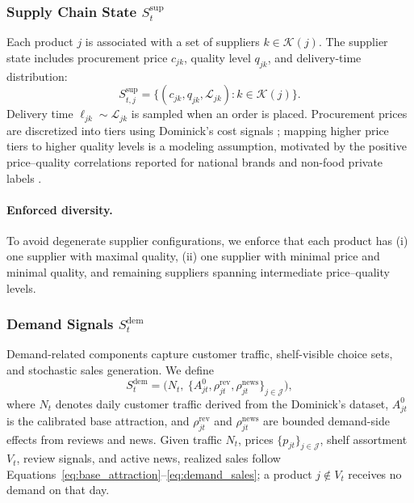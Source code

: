 \subsubsection{Supply Chain State \texorpdfstring{$S_t^{\text{sup}}$}{S t sup}}

Each product $j$ is associated with a set of suppliers $k \in \mathcal{K}(j)$. The supplier state includes procurement price $c_{jk}$, quality level $q_{jk}$, and delivery-time distribution:
\begin{equation}
S_{t,j}^{\text{sup}} =
\big\{(c_{jk}, q_{jk}, \mathcal{L}_{jk}) : k \in \mathcal{K}(j)\big\}.
\end{equation}
Delivery time $\ell_{jk} \sim \mathcal{L}_{jk}$ is sampled when an order is placed. Procurement prices are discretized into tiers using Dominick’s cost signals \citep{DominicksDataset}; mapping higher price tiers to higher quality levels is a modeling assumption, motivated by the positive price--quality correlations reported for national brands and non-food private labels \citep{supplychain}.

\paragraph{Enforced diversity.}
To avoid degenerate supplier configurations, we enforce that each product has (i) one supplier with maximal quality, (ii) one supplier with minimal price and minimal quality, and remaining suppliers spanning intermediate price–quality levels.

\subsubsection{Demand Signals \texorpdfstring{$S_t^{\text{dem}}$}{S t dem}}
\label{app:demand}

Demand-related components capture customer traffic, shelf-visible choice sets, and stochastic sales generation. We define
\begin{equation}
S_t^{\text{dem}} =
\big(
N_t,\ \{A^0_{jt},\rho^{\mathrm{rev}}_{jt},\rho^{\mathrm{news}}_{jt}\}_{j\in\mathcal{J}}
\big),
\end{equation}
where $N_t$ denotes daily customer traffic derived from the Dominick’s dataset, $A^0_{jt}$ is the calibrated base attraction, and $\rho^{\mathrm{rev}}_{jt}$ and $\rho^{\mathrm{news}}_{jt}$ are bounded demand-side effects from reviews and news. Given traffic $N_t$, prices $\{p_{jt}\}_{j\in\mathcal{J}}$, shelf assortment $V_t$, review signals, and active news, realized sales follow Equations~\ref{eq:base_attraction}--\ref{eq:demand_sales}; a product $j\notin V_t$ receives no demand on that day.

